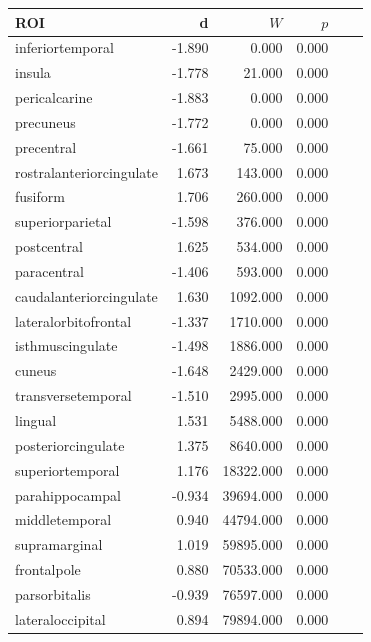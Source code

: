 \documentclass{article}
\begin{document}
\begin{table}
\centering
\begin{tabular}{lrrrrr}
	\toprule
	ROI & d &  \(W\) & \(p\) \\
	\midrule
	inferiortemporal         & -1.890 &  0.000       & 0.000 \\
	insula                   & -1.778 &  21.000      & 0.000 \\
	pericalcarine            & -1.883 &  0.000       & 0.000 \\
	precuneus                & -1.772 &  0.000       & 0.000 \\
	precentral               & -1.661 &  75.000      & 0.000 \\
	rostralanteriorcingulate & 1.673  &  143.000     & 0.000 \\
	fusiform                 & 1.706  &  260.000     & 0.000 \\
	superiorparietal         & -1.598 &  376.000     & 0.000 \\
	postcentral              & 1.625  &  534.000     & 0.000 \\
	paracentral              & -1.406 &  593.000     & 0.000 \\
	caudalanteriorcingulate  & 1.630  &  1092.000    & 0.000 \\
	lateralorbitofrontal     & -1.337 &  1710.000    & 0.000 \\
	isthmuscingulate         & -1.498 &  1886.000    & 0.000 \\
	cuneus                   & -1.648 &  2429.000    & 0.000 \\
	transversetemporal       & -1.510 &  2995.000    & 0.000 \\
	lingual                  &  1.531 &  5488.000    & 0.000 \\
	posteriorcingulate       &  1.375 &  8640.000    & 0.000 \\
	superiortemporal         &  1.176 &  18322.000   & 0.000 \\
	parahippocampal          & -0.934 &  39694.000   & 0.000 \\
	middletemporal           &  0.940 &  44794.000   & 0.000 \\
	supramarginal            &  1.019 &  59895.000   & 0.000 \\
	frontalpole              &  0.880 &  70533.000   & 0.000 \\
	parsorbitalis            & -0.939 &  76597.000   & 0.000 \\
	lateraloccipital         &  0.894 &  79894.000   & 0.000 \\

\end{tabular}
\end{table}
\end{document}
